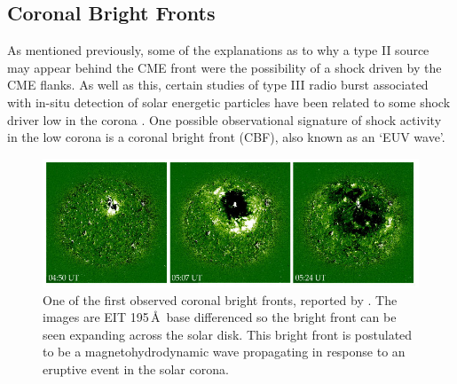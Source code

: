 \subsection{Coronal Bright Fronts}
As mentioned previously, some of the explanations as to why a type II source may appear behind the CME front were the possibility of a shock driven by the CME flanks. As well as this, certain studies of type III radio burst associated with in-situ detection of solar energetic particles have been related to some shock driver low in the corona {\color{blue}\citep{klassen2002, krucker1999}}. One possible observational signature of shock activity in the low corona is a coronal bright front (CBF), also known as an \textquoteleft EUV wave'.
\begin{figure}[!t]
\begin{center}
\includegraphics[scale=0.5, trim=0cm 0cm 0cm 1cm]{images/eit_19970512_wave}
\caption[First observation of an \textquoteleft EIT wave']{One of the first observed coronal bright fronts, reported by \citep{thompson1998}. The images are EIT 195\,\AA\, base differenced so the bright front can be seen expanding across the solar disk. This bright front is postulated to be a magnetohydrodynamic wave propagating in response to an eruptive event in the solar corona.}
\label{fig:cbf}
\end{center}
\end{figure}

